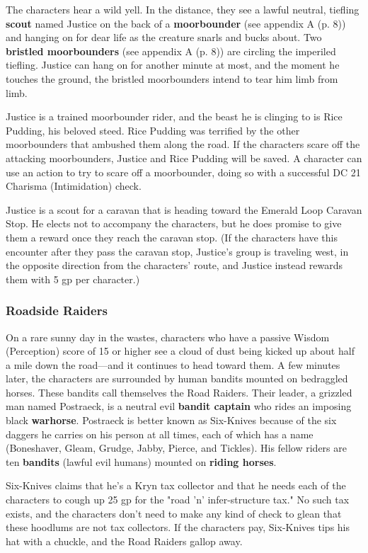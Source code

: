 \documentclass[letterpaper, 11pt, bg=full, twocolumn]{dndbook}
\begin{document}
The characters hear a wild yell. In the distance, they see a lawful neutral, tiefling \textbf{scout} named Justice on the back of a \textbf{moorbounder} (see appendix A (p. 8)) and hanging on for dear life as the creature snarls and bucks about. Two \textbf{bristled moorbounders} (see appendix A (p. 8)) are circling the imperiled tiefling. Justice can hang on for another minute at most, and the moment he touches the ground, the bristled moorbounders intend to tear him limb from limb.

Justice is a trained moorbounder rider, and the beast he is clinging to is Rice Pudding, his beloved steed. Rice Pudding was terrified by the other moorbounders that ambushed them along the road. If the characters scare off the attacking moorbounders, Justice and Rice Pudding will be saved. A character can use an action to try to scare off a moorbounder, doing so with a successful DC 21 Charisma (Intimidation) check.

Justice is a scout for a caravan that is heading toward the Emerald Loop Caravan Stop. He elects not to accompany the characters, but he does promise to give them a reward once they reach the caravan stop. (If the characters have this encounter after they pass the caravan stop, Justice's group is traveling west, in the opposite direction from the characters' route, and Justice instead rewards them with 5 gp per character.)

\subsubsection{Roadside Raiders}

On a rare sunny day in the wastes, characters who have a passive Wisdom (Perception) score of 15 or higher see a cloud of dust being kicked up about half a mile down the road---and it continues to head toward them. A few minutes later, the characters are surrounded by human bandits mounted on bedraggled horses. These bandits call themselves the Road Raiders. Their leader, a grizzled man named Postraeck, is a neutral evil \textbf{bandit captain} who rides an imposing black \textbf{warhorse}. Postraeck is better known as Six-Knives because of the six daggers he carries on his person at all times, each of which has a name (Boneshaver, Gleam, Grudge, Jabby, Pierce, and Tickles). His fellow riders are ten \textbf{bandits} (lawful evil humans) mounted on \textbf{riding horses}.

Six-Knives claims that he's a Kryn tax collector and that he needs each of the characters to cough up 25 gp for the "road 'n' infer-structure tax." No such tax exists, and the characters don't need to make any kind of check to glean that these hoodlums are not tax collectors. If the characters pay, Six-Knives tips his hat with a chuckle, and the Road Raiders gallop away.
\end{document}
